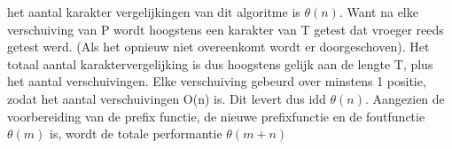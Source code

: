 het aantal karakter vergelijkingen van dit algoritme is $\theta(n)$. Want na elke verschuiving van P wordt hoogstens een karakter van T getest dat vroeger reeds getest werd. (Als het opnieuw niet overeenkomt wordt er doorgeschoven). Het totaal aantal karaktervergelijking is dus hoogstens gelijk aan de lengte T, plus het aantal verschuivingen. Elke verschuiving gebeurd over minstens 1 positie, zodat het aantal verschuivingen O(n) is. Dit levert dus idd $\theta(n)$.
\npar
Aangezien de voorbereiding van de prefix functie, de nieuwe prefixfunctie en de foutfunctie $\theta(m)$ is, wordt de totale performantie $\theta(m+n)$